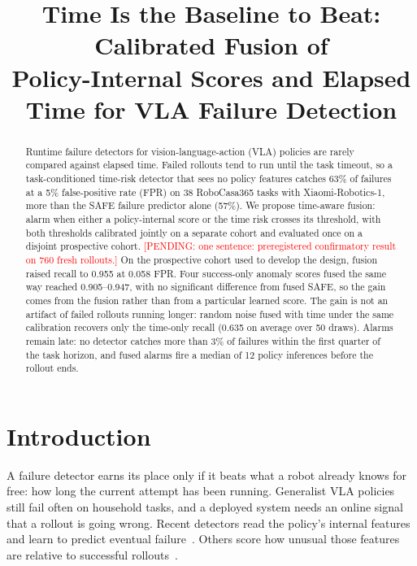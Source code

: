 \documentclass[conference,a4paper]{IEEEtran}
\newcommand{\pending}[1]{\textcolor{red}{[PENDING: #1]}}
\newcommand{\todo}[1]{\textcolor{orange}{[TODO: #1]}}
\begin{document}
\title{Time Is the Baseline to Beat: Calibrated Fusion of\\
Policy-Internal Scores and Elapsed Time for VLA Failure Detection}

\author{
\IEEEauthorblockA{Shinoda Lab \todo{affiliation and co-authors}}}

\maketitle

\begin{abstract}
Runtime failure detectors for vision-language-action (VLA) policies are rarely compared
against elapsed time. Failed rollouts tend to run until the task timeout, so a
task-conditioned time-risk detector that sees no policy features catches 63\% of failures
at a 5\% false-positive rate (FPR) on 38 RoboCasa365 tasks with Xiaomi-Robotics-1, more
than the SAFE failure predictor alone (57\%). We propose time-aware fusion: alarm when
either a policy-internal score or the time risk crosses its threshold, with both
thresholds calibrated jointly on a separate cohort and evaluated once on a disjoint
prospective cohort. \pending{one sentence: preregistered confirmatory result on 760 fresh
rollouts.} On the prospective cohort used to develop the design, fusion raised recall to
0.955 at 0.058 FPR. Four success-only anomaly scores fused the same way reached
0.905--0.947, with no significant difference from fused SAFE, so the gain comes from the
fusion rather than from a particular learned score. The gain is not an artifact of failed
rollouts running longer: random noise fused with time under the same calibration recovers
only the time-only recall (0.635 on average over 50 draws). Alarms remain late: no detector
catches more than 3\% of failures within the first quarter of the task horizon, and fused
alarms fire a median of 12 policy inferences before the rollout ends.
\end{abstract}

\section{Introduction}

A failure detector earns its place only if it beats what a robot already knows for free:
how long the current attempt has been running. Generalist VLA policies still fail often on
household tasks, and a deployed system needs an online signal that a rollout is going
wrong. Recent detectors read the policy's internal features and learn to predict eventual
failure~\cite{gu2025safe}. Others score how unusual those features are relative to
successful rollouts~\cite{xu2025faildetect,lee2018mahalanobis,sun2022knn}.
\end{document}
